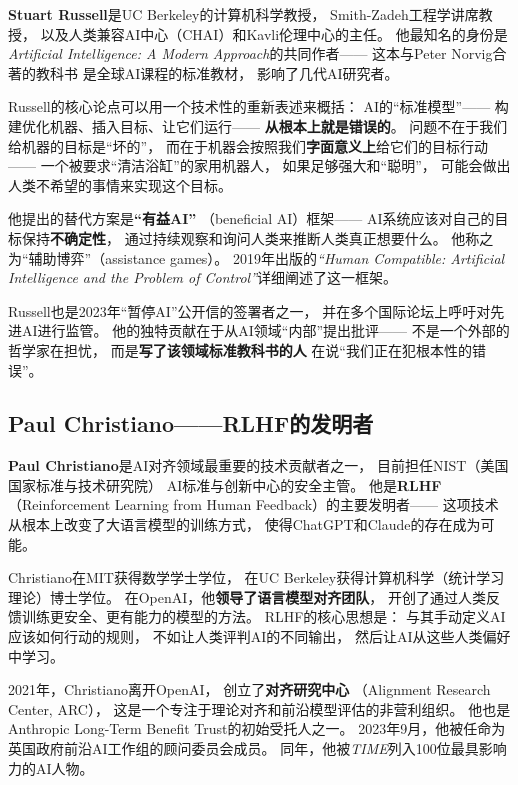 \textbf{Stuart Russell}是UC Berkeley的计算机科学教授，
Smith-Zadeh工程学讲席教授，
以及人类兼容AI中心（CHAI）和Kavli伦理中心的主任。
他最知名的身份是
\textit{Artificial Intelligence: A Modern Approach}的共同作者——
这本与Peter Norvig合著的教科书
是全球AI课程的标准教材，
影响了几代AI研究者。

Russell的核心论点可以用一个技术性的重新表述来概括：
AI的``标准模型''——
构建优化机器、插入目标、让它们运行——
\textbf{从根本上就是错误的}。
问题不在于我们给机器的目标是``坏的''，
而在于机器会按照我们\textbf{字面意义上}给它们的目标行动——
一个被要求``清洁浴缸''的家用机器人，
如果足够强大和``聪明''，
可能会做出人类不希望的事情来实现这个目标。

他提出的替代方案是\textbf{``有益AI''}
（beneficial AI）框架——
AI系统应该对自己的目标保持\textbf{不确定性}，
通过持续观察和询问人类来推断人类真正想要什么。
他称之为``辅助博弈''（assistance games）。
2019年出版的\textit{``Human Compatible: Artificial Intelligence
and the Problem of Control''}详细阐述了这一框架。

Russell也是2023年``暂停AI''公开信的签署者之一，
并在多个国际论坛上呼吁对先进AI进行监管。
他的独特贡献在于从AI领域``内部''提出批评——
不是一个外部的哲学家在担忧，
而是\textbf{写了该领域标准教科书的人}
在说``我们正在犯根本性的错误''。

\subsection{Paul Christiano——RLHF的发明者}
\label{subsec:christiano}

\textbf{Paul Christiano}是AI对齐领域最重要的技术贡献者之一，
目前担任NIST（美国国家标准与技术研究院）
AI标准与创新中心的安全主管。
他是\textbf{RLHF}
（Reinforcement Learning from Human Feedback）的主要发明者——
这项技术从根本上改变了大语言模型的训练方式，
使得ChatGPT和Claude的存在成为可能。

Christiano在MIT获得数学学士学位，
在UC Berkeley获得计算机科学（统计学习理论）博士学位。
在OpenAI，他\textbf{领导了语言模型对齐团队}，
开创了通过人类反馈训练更安全、更有能力的模型的方法。
RLHF的核心思想是：
与其手动定义AI应该如何行动的规则，
不如让人类评判AI的不同输出，
然后让AI从这些人类偏好中学习。

2021年，Christiano离开OpenAI，
创立了\textbf{对齐研究中心}
（Alignment Research Center, ARC），
这是一个专注于理论对齐和前沿模型评估的非营利组织。
他也是Anthropic Long-Term Benefit Trust的初始受托人之一。
2023年9月，他被任命为英国政府前沿AI工作组的顾问委员会成员。
同年，他被\textit{TIME}列入100位最具影响力的AI人物。

